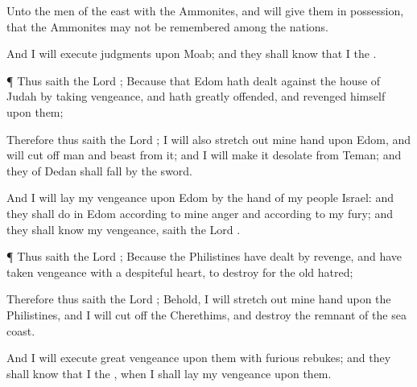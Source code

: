 {Unto the
men of the
east with the
Ammonites, and will
give them in
possession, that the
Ammonites may not be
remembered among the
nations.

And I will
execute
judgments upon
Moab; and they shall
know that I
{} the
{}.


\par }{\PP {}¶ Thus
saith the
Lord
{}; Because that
Edom hath
dealt against the
house of
Judah by
taking
vengeance, and hath
greatly
offended, and
revenged himself upon them;

Therefore thus
saith the
Lord
{}; I will also stretch
out mine
hand upon
Edom, and will cut
off
man and
beast from it; and I will
make it
desolate from
Teman; and they of
Dedan shall
fall by the
sword.

And I will
lay my
vengeance upon
Edom by the
hand of my
people
Israel: and they shall
do in
Edom according to mine
anger and according to my
fury; and they shall
know my
vengeance,
saith the
Lord
{}.


\par }{\PP {}¶ Thus
saith the
Lord
{}; Because the
Philistines have
dealt by
revenge, and have
taken
vengeance with a
despiteful
heart, to
destroy
{} for the
old
hatred;

Therefore thus
saith the
Lord
{}; Behold, I will stretch
out mine
hand upon the
Philistines, and I will cut
off the
Cherethims, and
destroy the
remnant of the
sea
coast.

And I will
execute
great
vengeance upon them with
furious
rebukes; and they shall
know that I
{} the
{}, when I shall
lay my
vengeance upon them.




\par }
